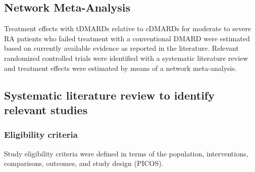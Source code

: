 \documentclass[11pt,final,fleqn]{article}
\theoremstyle{plain}
\begin{document}
\begin{appendices}
\section{Network Meta-Analysis}\label{appendix:NMA}
Treatment effects with tDMARDs relative to cDMARDs for moderate to severe RA patients who failed treatment with a conventional DMARD were estimated based on currently available evidence as reported in the literature. Relevant randomized controlled trials were identified with a systematic literature review and treatment effects were estimated by means of a network meta-analysis.


\subsection{Systematic literature review to identify relevant studies}\label{systematic-literature-review}

\subsubsection{Eligibility criteria}
Study eligibility criteria were defined in terms of the population, interventions, comparisons, outcomes, and study design (PICOS).


\end{appendices}
\end{document}

